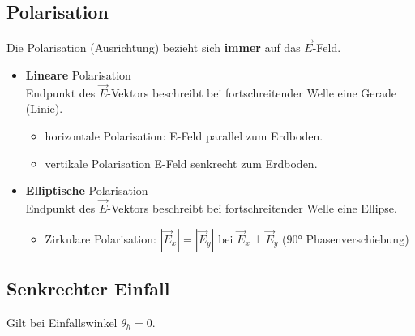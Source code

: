 \subsection{Polarisation}
Die Polarisation (Ausrichtung) bezieht sich \textbf{immer} auf das $\vec{E}$-Feld.
\begin{itemize}
	\item \textbf{Lineare} Polarisation\\
	Endpunkt des $\vec{E}$-Vektors beschreibt bei fortschreitender Welle eine Gerade (Linie).
		\begin{itemize}
				\item horizontale Polarisation: E-Feld parallel zum Erdboden.
				\item vertikale Polarisation E-Feld senkrecht zum Erdboden.
			\end{itemize}
	\item \textbf{Elliptische} Polarisation\\
	Endpunkt des $\vec{E}$-Vektors beschreibt bei fortschreitender Welle eine Ellipse.
		\begin{itemize}
				\item Zirkulare Polarisation: $|\vec{E}_x| = |\vec{E}_y|$ bei $ \vec{E}_x \perp \vec{E}_y $ ($ \ang{90}$ Phasenverschiebung)
			\end{itemize}
\end{itemize}



\subsection[Senkrechter Einfall]{Senkrechter Einfall}
Gilt bei Einfallswinkel $ \theta_h = 0 $.


